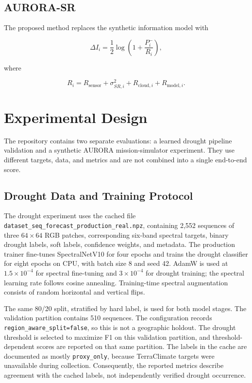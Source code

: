 \documentclass[11pt,a4paper]{article}
\begin{document}
\subsection{AURORA-SR}

The proposed method replaces the synthetic information model with

\begin{equation}
\Delta I_i
=
\frac12
\log
\left(
1+\frac{P_i^-}{R_i}
\right),
\end{equation}

where

\begin{equation}
R_i
=
R_{\mathrm{sensor}}
+
\sigma^2_{SR,i}
+
R_{\mathrm{cloud},i}
+
R_{\mathrm{model},i}.
\end{equation}


\section{Experimental Design}

The repository contains two separate evaluations: a learned drought
pipeline validation and a synthetic AURORA mission-simulator
experiment. They use different targets, data, and metrics and are not
combined into a single end-to-end score.

\subsection{Drought Data and Training Protocol}

The drought experiment uses the cached file
\texttt{dataset\_seq\_forecast\_production\_real.npz}, containing
2,552 sequences of three $64\times64$ RGB patches, corresponding
six-band spectral targets, binary drought labels, soft labels,
confidence weights, and metadata. The production trainer fine-tunes
SpectralNetV10 for four epochs and trains the drought classifier for
eight epochs on CPU, with batch size 8 and seed 42. AdamW is used at
$1.5\times10^{-4}$ for spectral fine-tuning and $3\times10^{-4}$ for
drought training; the spectral learning rate follows cosine annealing.
Training-time spectral augmentation consists of random horizontal and
vertical flips.

The same 80/20 split, stratified by hard label, is used for both model
stages. The validation partition contains 510 sequences. The
configuration records \texttt{region\_aware\_split=false}, so this is
not a geographic holdout. The drought threshold is selected to maximize
F1 on this validation partition, and threshold-dependent scores are
reported on that same partition. The labels in the cache are documented
as mostly \texttt{proxy\_only}, because TerraClimate targets were
unavailable during collection. Consequently, the reported metrics
describe agreement with the cached labels, not independently verified
drought occurrence.
\end{document}
